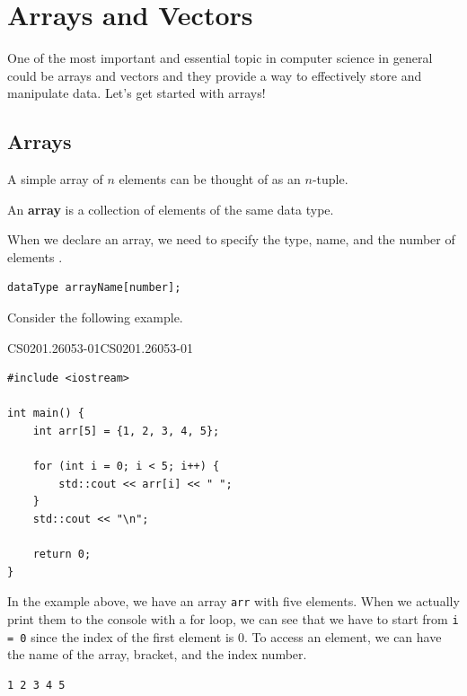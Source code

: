 \documentclass[../../../main.tex]{subfiles}
\begin{document}
\section{Arrays and Vectors}

One of the most important and essential topic in computer science
in general could be arrays and vectors and they provide a way
to effectively store and manipulate data. Let's get started with
arrays!

\subsection{Arrays}

A simple array of $n$ elements can be thought of as an $n$-tuple.

\begin{definition}{}{}
An \textbf{array} is a collection of elements of the same
data type.
\end{definition}

When we declare an array, we need to specify the type, name, and
the number of elements \cite{CS02-4}.

\begin{basicbox}
\begin{lstlisting}[style=basic]
dataType arrayName[number];
\end{lstlisting}
\end{basicbox}

Consider the following example.

\begin{cppbox}{CS0201.26053-01}{CS0201.26053-01}
\begin{lstlisting}[style=cppstyle]
#include <iostream>

int main() {
    int arr[5] = {1, 2, 3, 4, 5};

    for (int i = 0; i < 5; i++) {
        std::cout << arr[i] << " ";
    }
    std::cout << "\n";

    return 0;
}
\end{lstlisting}
\end{cppbox}

In the example above, we have an array \verb|arr| with five elements.
When we actually print them to the console with a for loop, we can
see that we have to start from \verb|i = 0| since the index of the
first element is $0$. To access an element, we can have the name
of the array, bracket, and the index number.

\begin{outputbox}
\begin{lstlisting}[style=basic]
1 2 3 4 5
\end{lstlisting}
\end{outputbox}
\end{document}
